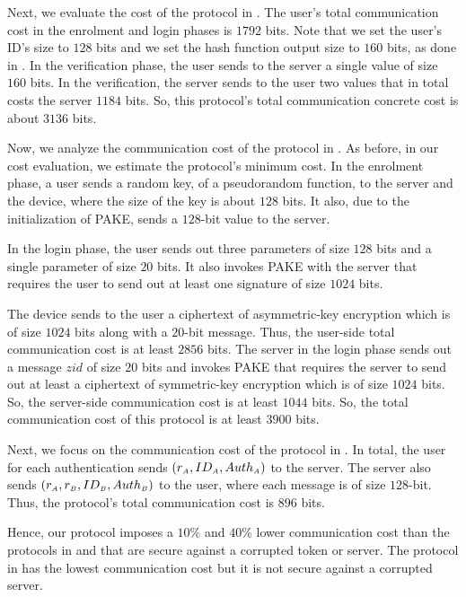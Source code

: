 Next, we evaluate the cost of the protocol in \cite{WangW18}. The user's total communication cost in the enrolment and login phases is $1792$ bits. Note that we set the user's ID's size to $128$ bits and we set the hash function output size to $160$ bits, as done in \cite{WangW18}. In the verification phase, the user sends to the server a single value of size $160$ bits. In the verification, the server sends to the user two values that in total costs the server $1184$ bits. So, this protocol's total communication concrete cost is about $3136$ bits.%


Now, we analyze the communication cost of the protocol in \cite{JareckiJKSS21}. As before, in our cost evaluation, we estimate the protocol's minimum cost.  In the enrolment phase, a user sends a random key, of a pseudorandom function, to the server and the device, where the size of the key is about $128$ bits. It also, due to the initialization of PAKE, sends a $128$-bit value to the server.

 In the login phase, the user sends out three parameters of size $128$ bits and a single parameter of size $20$ bits.  It also invokes PAKE with the server that requires the user to send out at least one signature of size $1024$ bits. 

The device sends to the user a ciphertext of asymmetric-key encryption which is of size $1024$ bits along with a $20$-bit message. Thus, the user-side total communication cost is at least $2856$ bits. The server in the login phase sends out a message $zid$ of size $20$ bits and invokes PAKE that requires the server to send out at least a ciphertext of symmetric-key encryption which is of size $1024$ bits.  So, the server-side communication cost is at least $1044$ bits. So, the total communication cost of this protocol is at least $3900$ bits. 

Next, we focus on the communication cost of the protocol in \cite{MatsuoMY11}. In total, the user for each authentication sends   $(r_{\scriptscriptstyle A}, ID_{\scriptscriptstyle A}, Auth_{\scriptscriptstyle A})$ to the server. The server also sends $(r_{\scriptscriptstyle A}, r_{\scriptscriptstyle B}, ID_{\scriptscriptstyle B}, Auth_{\scriptscriptstyle B})$ to the user, where each message is of size $128$-bit. Thus, the protocol's total communication cost is $896$ bits. 


Hence, our protocol imposes a $10\%$ and $40\%$ lower communication cost than the protocols in \cite{WangW18} and \cite{JareckiJKSS21} that are secure against a corrupted token or server. The protocol in \cite{MatsuoMY11} has the lowest communication cost but it is not secure against a corrupted server. 

